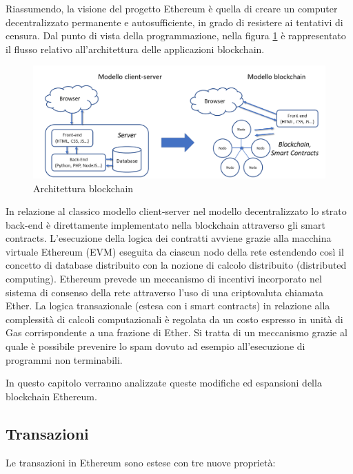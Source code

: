 Riassumendo, la visione del progetto Ethereum è quella di creare un computer decentralizzato permanente e autosufficiente, in grado di resistere ai tentativi di censura. Dal punto di vista della programmazione, nella figura \ref{fig:ArchitetturaBlockchain} è rappresentato il flusso relativo all’architettura delle applicazioni blockchain.

\begin{figure}[H]
\centering
\includegraphics[width=1\textwidth]{immagini/architetturav1.png}
\caption{Architettura blockchain}
\label{fig:ArchitetturaBlockchain}
\end{figure}

In relazione al classico modello client-server nel modello decentralizzato lo strato back-end è direttamente implementato nella blockchain attraverso gli smart contracts. L’esecuzione della logica dei contratti avviene grazie alla macchina virtuale Ethereum (EVM) eseguita da ciascun nodo della rete estendendo così il concetto di database distribuito con la nozione di calcolo distribuito (distributed computing). Ethereum prevede un meccanismo di incentivi incorporato nel sistema di consenso della rete attraverso l’uso di una criptovaluta chiamata Ether. La logica transazionale (estesa con i smart contracts) in relazione alla complessità di calcoli computazionali è regolata da un costo espresso in unità di Gas corrispondente a una frazione di Ether. Si tratta di un meccanismo grazie al quale è possibile prevenire lo spam dovuto ad esempio all’esecuzione di programmi non terminabili.

In questo capitolo verranno analizzate queste modifiche ed espansioni della blockchain Ethereum.

\subsection{Transazioni}

Le transazioni in Ethereum sono estese con tre nuove proprietà:


